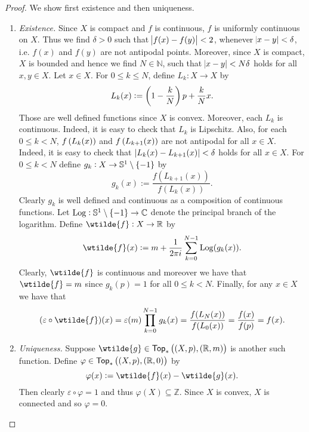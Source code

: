 \begin{proof}
	We show first existence and then uniqueness.
	\begin{enumerate}[label = \textit{Step \arabic*:},wide = 0pt, itemsep = 1.5ex]
		\item \textit{Existence.} Since $X$ is compact and $f$ is continuous, $f$ is uniformly continuous on $X$. Thus we find $\delta > 0$ such that $\abs{f(x) - f(y)} < 2$, whenever $\abs{x - y} < \delta$, i.e. $f(x)$ and $f(y)$ are not antipodal points. Moreover, since $X$ is compact, $X$ is bounded and hence we find $N \in \mathbb{N}$, such that $\abs{x - y} < N\delta$ holds for all $x,y \in X$. Let $x \in X$. For $0 \leq k \leq N$, define $L_k : X \to X$ by
			\begin{equation*}
				L_k(x) := \del[3]{1 - \frac{k}{N}}p + \frac{k}{N}x.
			\end{equation*}
		Those are well defined functions since $X$ is convex. Moreover, each $L_k$ is continuous. Indeed, it is easy to check that $L_k$ is Lipschitz. Also, for each $0 \leq k < N$, $f\del[0]{L_k(x)}$ and $f\del[0]{L_{k + 1}(x)}$ are not antipodal for all $x \in X$. Indeed, it is easy to check that $\abs[0]{L_k(x) - L_{k + 1}(x)} < \delta$ holds for all $x \in X$. For $0 \leq k < N$ define $g_k : X \to \mathbb{S}^1 \setminus \cbr{-1}$ by
			\begin{equation*}
				g_k(x) := \frac{f(L_{k + 1}(x))}{f(L_k(x))}.
			\end{equation*}
		Clearly $g_k$ is well defined and continuous as a composition of continuous functions. Let $\Log : \mathbb{S}^1 \setminus \cbr{-1} \to \mathbb{C}$ denote the principal branch of the logarithm. Define $\wtilde{f} : X \to \mathbb{R}$ by
			\begin{equation*}
				\wtilde{f}(x) := m + \frac{1}{2\pi i} \sum_{k = 0}^{N - 1} \Log(g_k(x)).
			\end{equation*}
		Clearly, $\wtilde{f}$ is continuous and moreover we have that $\wtilde{f} = m$ since $g_k(p) = 1$ for all $0\leq k < N$. Finally, for any $x \in X$ we have that
			\begin{equation*}
				(\varepsilon \circ \wtilde{f})(x) = \varepsilon(m)\prod_{k = 0}^{N - 1} g_k(x) = \frac{f(L_N(x))}{f(L_0(x))} = \frac{f(x)}{f(p)} = f(x). 
			\end{equation*}
		\item \textit{Uniqueness.} Suppose $\wtilde{g} \in \mathsf{Top}_\ast\del[1]{(X,p),(\mathbb{R},m)}$ is another such function. Define $\varphi \in \mathsf{Top}_\ast\del[1]{(X,p),(\mathbb{R},0)}$ by
			\begin{equation*}
				\varphi(x) := \wtilde{f}(x) - \wtilde{g}(x).
			\end{equation*}
		Then clearly $\varepsilon \circ \varphi = 1$ and thus $\varphi(X) \subseteq \mathbb{Z}$. Since $X$ is convex, $X$ is connected and so $\varphi = 0$.
	\end{enumerate}
\end{proof}

